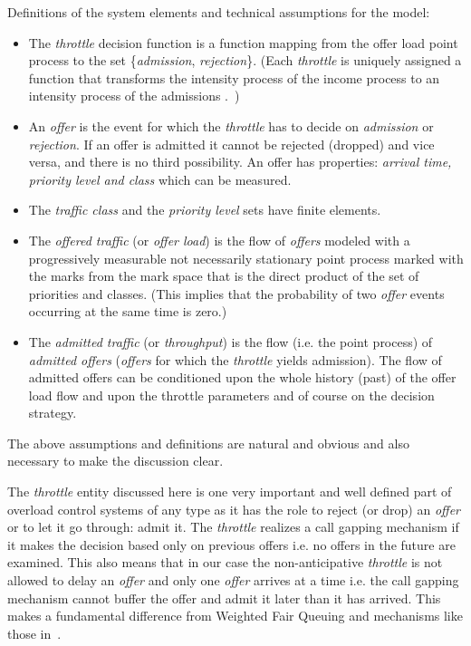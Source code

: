 \documentclass[conference]{IEEEtran}
\begin{document}
Definitions of the system elements and technical assumptions for the
model:
\begin{itemize}
 \item The \textit{throttle} decision function is a function mapping from the offer load point process
 to the set \{\textit{admission}, \textit{rejection}\}. (Each
 \textit{throttle} is uniquely assigned a function  that transforms the intensity process  of the income process to
an intensity process of the admissions
.~\cite{OGATA})
 \item An \textit{offer} is the event for which the \textit{throttle} has to decide on \textit{admission} or \textit{rejection}. If an offer is
admitted it cannot be rejected (dropped) and vice versa, and there
is no third possibility. An offer has properties: \textit{arrival
time, priority level and class} which can be measured.
 \item The \textit{traffic class} and the \textit{priority level} sets have finite elements.
 \item The \textit{offered traffic} (or \textit{offer load}) is the flow of \textit{offers} modeled with a
progressively measurable not necessarily stationary point process
marked with the marks from the mark space that is the direct product
of the set of priorities and classes. (This implies that the
probability of two \textit{offer} events occurring at the same time
is zero.)
 \item The \textit{admitted traffic} (or \textit{throughput}) is the flow (i.e. the point process) of \textit{admitted offers}
(\textit{offers} for which the \textit{throttle} yields admission).
The flow of admitted offers can be conditioned upon the whole
history (past) of the offer load flow and upon the throttle
parameters and of course on the decision strategy.
\end{itemize}

The above assumptions and definitions are natural and obvious and
also necessary to make the discussion clear.

The \textit{throttle} entity discussed here is one very important
and well defined part of overload control systems of any type as it
has the role to reject (or drop) an \textit{offer} or to let it go
through: admit it. The \textit{throttle} realizes a call gapping
mechanism if it makes the decision based only on previous offers
i.e. no offers in the future are examined. This also means that in
our case the non-anticipative \textit{throttle} is not allowed to
delay an \textit{offer} and only one \textit{offer} arrives at a
time i.e. the call gapping mechanism cannot buffer the offer and
admit it later than it has arrived. This makes a fundamental
difference from Weighted Fair Queuing and mechanisms like those
in~\cite{WFQ,GPS}.
\end{document}
